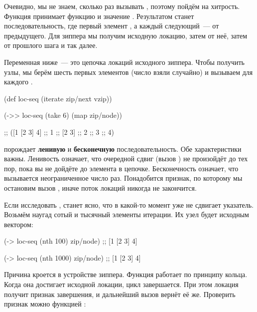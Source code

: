 Очевидно, мы не знаем, сколько раз вызывать , поэтому пойдём на
хитрость. Функция  принимает функцию  и значение . Результатом
станет последовательность, где первый элемент , а каждый следующий~--- 
от предыдущего. Для зиппера мы получим исходную локацию, затем  от
неё, затем  от прошлого шага и так далее.

Переменная  ниже~--- это цепочка локаций исходного зиппера. Чтобы
получить узлы, мы берём шесть первых элементов (число взяли случайно) и вызываем
для каждого .

\begin{english}
  \begin{clojure}
(def loc-seq (iterate zip/next vzip))

(->> loc-seq
     (take 6)
     (map zip/node))

;; ([1 [2 3] 4]
;;   1
;;   [2 3]
;;   2
;;   3
;;   4)
  \end{clojure}
\end{english}

 порождает \textbf{ленивую} и \textbf{бесконечную} последовательность. Обе
характеристики важны. Ленивость означает, что очередной сдвиг (вызов )
не произойдёт до тех пор, пока вы не дойдёте до элемента в
цепочке. Бесконечность означает, что  вызывается неограниченное число
раз. Понадобится признак, по которому мы остановим вызов , иначе поток
локаций никогда не закончится.

Если исследовать , станет ясно, что в какой-то момент  уже не
сдвигает указатель. Возьмём наугад сотый и тысячный элементы итерации. Их узел
будет исходным вектором:

\begin{english}
  \begin{clojure}
(-> loc-seq (nth 100) zip/node)
;; [1 [2 3] 4]

(-> loc-seq (nth 1000) zip/node)
;; [1 [2 3] 4]

  \end{clojure}
\end{english}

Причина кроется в устройстве зиппера. Функция  работает по принципу
кольца. Когда она достигает исходной локации, цикл завершается. При этом локация
получит признак завершения, и дальнейший вызов  вернёт её
же. Проверить признак можно функцией :

